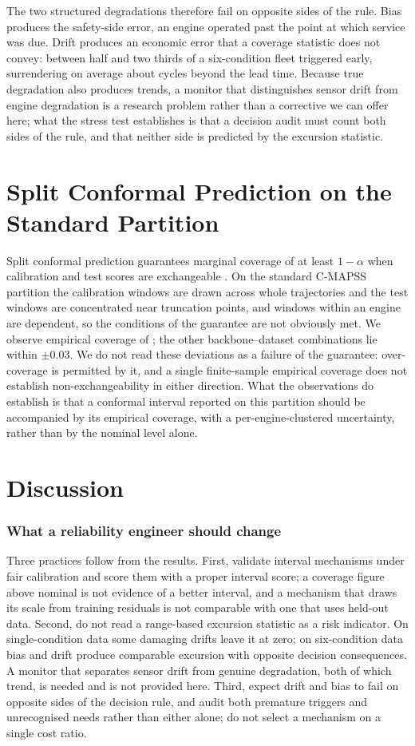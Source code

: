 \documentclass[journal]{IEEEtran}
\begin{document}
The two structured degradations therefore fail on opposite sides of the rule. Bias produces the safety-side error, an engine operated past the point at which service was due. Drift produces an economic error that a coverage statistic does not convey: between half and two thirds of a six-condition fleet triggered early, surrendering on average about \NDriftExcess{} cycles beyond the lead time. Because true degradation also produces trends, a monitor that distinguishes sensor drift from engine degradation is a research problem rather than a corrective we can offer here; what the stress test establishes is that a decision audit must count both sides of the rule, and that neither side is predicted by the excursion statistic.

\section{Split Conformal Prediction on the Standard Partition}
\label{sec:cp}
Split conformal prediction guarantees marginal coverage of at least $1-\alpha$ when calibration and test scores are exchangeable \cite{barber2023}. On the standard C-MAPSS partition the calibration windows are drawn across whole trajectories and the test windows are concentrated near truncation points, and windows within an engine are dependent, so the conditions of the guarantee are not obviously met. We observe empirical coverage of \NCPOutside; the other \NCPInsideN{} backbone--dataset combinations lie within $\pm0.03$. We do not read these deviations as a failure of the guarantee: over-coverage is permitted by it, and a single finite-sample empirical coverage does not establish non-exchangeability in either direction. What the observations do establish is that a conformal interval reported on this partition should be accompanied by its empirical coverage, with a per-engine-clustered uncertainty, rather than by the nominal level alone.

\section{Discussion}
\label{sec:discussion}
\subsubsection*{What a reliability engineer should change}
Three practices follow from the results. First, validate interval mechanisms under fair calibration and score them with a proper interval score; a coverage figure above nominal is not evidence of a better interval, and a mechanism that draws its scale from training residuals is not comparable with one that uses held-out data. Second, do not read a range-based excursion statistic as a risk indicator. On single-condition data some damaging drifts leave it at zero; on six-condition data bias and drift produce comparable excursion with opposite decision consequences. A monitor that separates sensor drift from genuine degradation, both of which trend, is needed and is not provided here. Third, expect drift and bias to fail on opposite sides of the decision rule, and audit both premature triggers and unrecognised needs rather than either alone; do not select a mechanism on a single cost ratio.
\end{document}

